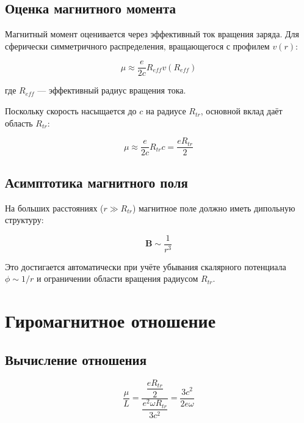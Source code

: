 \documentclass[12pt,a4paper]{article}
\begin{document}
\subsection{Оценка магнитного момента}

Магнитный момент оценивается через эффективный ток вращения заряда. Для сферически симметричного распределения, вращающегося с профилем $v(r)$:

\begin{equation}
    \mu \approx \frac{e}{2c} R_{eff} v(R_{eff})
\end{equation}

где $R_{eff}$ --- эффективный радиус вращения тока.

Поскольку скорость насыщается до $c$ на радиусе $R_{tr}$, основной вклад даёт область $R_{tr}$:

\begin{equation}
    \mu \approx \frac{e}{2c} R_{tr} c = \frac{e R_{tr}}{2}
\end{equation}

\subsection{Асимптотика магнитного поля}

На больших расстояниях ($r \gg R_{tr}$) магнитное поле должно иметь дипольную структуру:

\begin{equation}
    \mathbf{B} \sim \frac{1}{r^3}
\end{equation}

Это достигается автоматически при учёте убывания скалярного потенциала $\phi \sim 1/r$ и ограничении области вращения радиусом $R_{tr}$.

\section{Гиромагнитное отношение}

\subsection{Вычисление отношения}

\begin{equation}
    \frac{\mu}{L} = \frac{ \dfrac{e R_{tr}}{2} }{ \dfrac{e^2 \omega R_{tr}}{3 c^2} } = \frac{3 c^2}{2 e \omega}
\end{equation}
\end{document}
